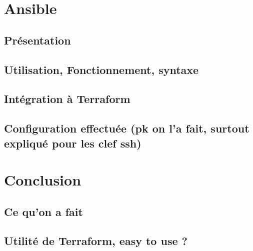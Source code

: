 \documentclass[]{article}
\begin{document}
\section{Ansible}\label{ansible}

\subsection{Présentation}\label{pruxe9sentation}

\subsection{Utilisation, Fonctionnement,
syntaxe}\label{utilisation-fonctionnement-syntaxe}

\subsection{Intégration à
Terraform}\label{intuxe9gration-uxe0-terraform}

\subsection{Configuration effectuée (pk on l'a fait, surtout expliqué
pour les clef
ssh)}\label{configuration-effectuuxe9e-pk-on-la-fait-surtout-expliquuxe9-pour-les-clef-ssh}

\section{Conclusion}\label{conclusion}

\subsection{Ce qu'on a fait}\label{ce-quon-a-fait}

\subsection{Utilité de Terraform, easy to use
?}\label{utilituxe9-de-terraform-easy-to-use}
\end{document}

